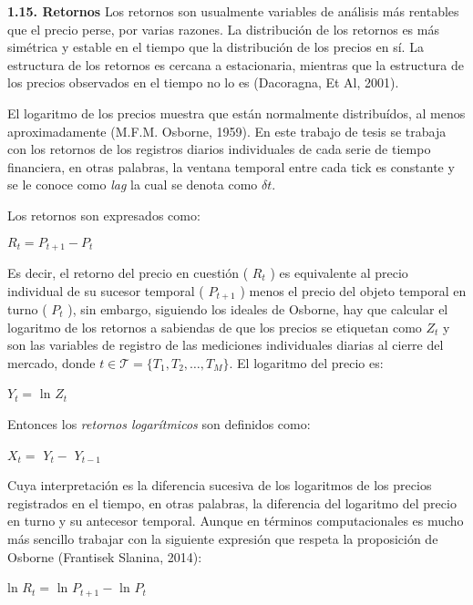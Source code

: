 {
\Large  \textbf{1.15. Retornos} 
}
\newline
Los retornos son usualmente variables de análisis más rentables que el precio perse, por varias razones. La distribución de los retornos es más simétrica y estable en el tiempo que la distribución de los precios en sí. La estructura de los retornos es cercana a estacionaria, mientras que la estructura de los precios observados en el tiempo no lo es (Dacoragna, Et Al, 2001).
\newpage

El logaritmo de los precios muestra que están normalmente distribuídos, al menos aproximadamente (M.F.M. Osborne, 1959). En este trabajo de tesis se trabaja con los retornos de los registros diarios individuales de cada serie de tiempo financiera, en otras palabras, la ventana temporal entre cada \guillemotleft tick \guillemotright es constante y se le conoce como \textit{lag} la cual se denota como $\delta t$. 
\newline

Los retornos son expresados como:
\begin{center}
$R_t=P_{t+1}-P_t$
\end{center}
Es decir, el retorno del precio en cuestión ( $R_t$ ) es equivalente al precio individual de su sucesor temporal ( $P_{t+1}$ ) menos el precio del objeto temporal en turno ( $P_t$ ), sin embargo, siguiendo los ideales de Osborne, hay que calcular el logaritmo de los retornos a sabiendas de que los precios se etiquetan como $\mathit{Z_t}$ y son las variables de registro de las mediciones individuales diarias al cierre del mercado, donde \newline $t \in \mathcal{T} = \{\mathit{T_1,T_2,\ldots , T_M}\}$. El logaritmo del precio es:

\begin{center}
$\mathit{Y_{t}} = $ ln $\mathit{Z_{t}}$
\end{center}

Entonces los \textit{retornos logarítmicos} son definidos como: 

\begin{center}
$X_t = $ $\mathit{Y_{t}} - $  $\mathit{Y_{t - 1}}$
\end{center}

Cuya interpretación es la diferencia sucesiva de los logaritmos de los precios  registrados en el tiempo, en otras palabras, la diferencia del logaritmo del precio en turno y su antecesor temporal. Aunque en términos computacionales es mucho más sencillo trabajar con la siguiente expresión que respeta la proposición de Osborne (Frantisek Slanina, 2014): 
\begin{center}
ln $R_t = $ ln $\mathit{P_{t+1}} - $ ln $\mathit{P_{t}}$
\end{center}%

